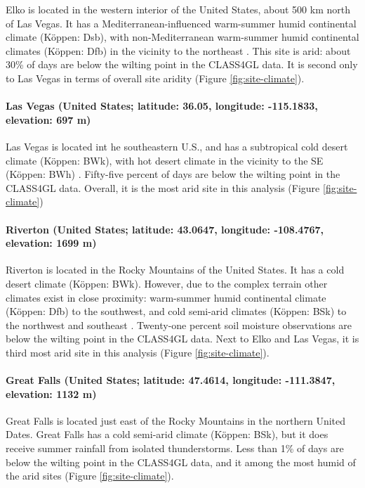 \documentclass[12pt]{article}
\begin{document}
Elko is located in the western interior of the United States, about
500 km north of Las Vegas. It has a Mediterranean-influenced
warm-summer humid continental climate (K\"{o}ppen: Dsb), with
non-Mediterranean warm-summer humid continental climates (K\"{o}ppen:
Dfb) in the vicinity to the northeast \cite{rubel2010}. This site is
arid: about 30\% of days are below the wilting point in the CLASS4GL
data. It is second only to Las Vegas in terms of overall site aridity
(Figure \ref{fig:site-climate}).

\paragraph{Las Vegas (United States; latitude: 36.05, longitude:
  -115.1833, elevation: 697 m)}

Las Vegas is located int he southeastern U.S., and has a subtropical
cold desert climate (K\"{o}ppen: BWk), with hot desert climate in the
vicinity to the SE (K\"{o}ppen: BWh) \cite{rubel2010}. Fifty-five
percent of days are below the wilting point in the CLASS4GL
data. Overall, it is the most arid site in this analysis (Figure
\ref{fig:site-climate})

\paragraph{Riverton (United States; latitude: 43.0647, longitude:
  -108.4767, elevation: 1699 m)}

Riverton is located in the Rocky Mountains of the United States. It
has a cold desert climate (K\"{o}ppen: BWk). However, due to the
complex terrain other climates exist in close proximity: warm-summer
humid continental climate (K\"{o}ppen: Dfb) to the southwest, and cold
semi-arid climates (K\"{o}ppen: BSk) to the northwest and southeast
\cite{rubel2010}. Twenty-one percent soil moisture observations are
below the wilting point in the CLASS4GL data. Next to Elko and Las
Vegas, it is third most arid site in this analysis (Figure
\ref{fig:site-climate}).

\paragraph{Great Falls (United States; latitude: 47.4614, longitude:
  -111.3847, elevation: 1132 m)}

Great Falls is located just east of the Rocky Mountains in the
northern United Dates. Great Falls has a cold semi-arid climate
(K\"{o}ppen: BSk), but it does receive summer rainfall from isolated
thunderstorms. Less than 1\% of days are below the wilting point in
the CLASS4GL data, and it among the most humid of the arid sites
(Figure \ref{fig:site-climate}).
\end{document}
